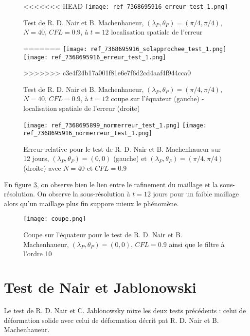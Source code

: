 \begin{figure}[ht]
\begin{center}
<<<<<<< HEAD
\texttt{[image: ref\_7368695916\_erreur\_test\_1.png]}
\caption{Test de R. D. Nair et B. Machenhaueur, $(\lambda_P, \theta_P) = (\pi/4,\pi/4)$, $N=40$, $CFL=0.9$, à $t=12$  localisation spatiale de l'erreur }
=======
\texttt{[image: ref\_7368695916\_solapprochee\_test\_1.png]}
\texttt{[image: ref\_7368695916\_erreur\_test\_1.png]}
\caption{Test de R. D. Nair et B. Machenhaueur, $(\lambda_P, \theta_P) = (\pi/4,\pi/4)$, $N=40$, $CFL=0.9$, à $t=12$ coupe sur l'équateur (gauche) - localisation spatiale de l'erreur (droite)}
>>>>>>> c3e4f24b17a001f81e6e7f6d2cd4aaf4f944cca0
\label{fig NM2}
\end{center}
\end{figure}

\begin{figure}[ht]
\begin{center}
\texttt{[image: ref\_7368695899\_normerreur\_test\_1.png]}
\texttt{[image: ref\_7368695916\_normerreur\_test\_1.png]}
\caption{Erreur relative pour le test de R. D. Nair et B. Machenhaueur sur 12 jours,  $(\lambda_P, \theta_P) = (0,0)$ (gauche) et $(\lambda_P, \theta_P) = (\pi/4,\pi/4)$ (droite) avec $N=40$ et $CFL=0.9$}
\label{fig NM3}
\end{center}
\end{figure}

En figure \ref{fig NM4}, on observe bien le lien entre le rafinement du maillage et la sous-résolution. On observe la sous-résolution à $t=12$ jours pour un faible maillage alors qu'un maillage plus fin suppore mieux le phénomène.

\begin{figure}[ht]
\begin{center}
\texttt{[image: coupe.png]}
\caption{Coupe sur l'équateur pour le test de R. D. Nair et B. Machenhaueur, $(\lambda_P, \theta_P) = (0,0)$, $CFL=0.9$ ainsi que le filtre à l'ordre 10}
\label{fig NM4}
\end{center}
\end{figure}


\section{Test de Nair et Jablonowski}

Le test de R. D. Nair et C. Jablonowsky \cite{Nair2008} mixe les deux tests précédents : celui de déformation solide avec celui de déformation décrit pat R. D. Nair et B. Machenhaueur.

